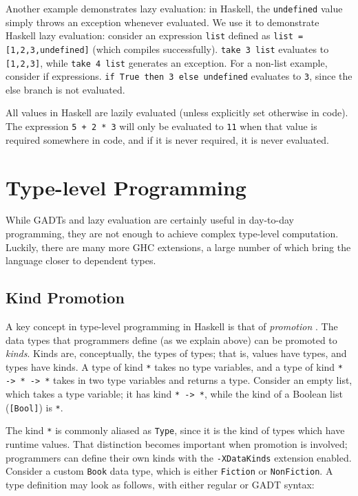 \documentclass[12pt, a4paper, bibliography=totocnumbered]{scrreprt}
\newcommand{\inline}[1]{\lstinline[basicstyle=\ttfamily\footnotesize]{#1}}
\begin{document}
Another example demonstrates lazy evaluation: in Haskell, the \inline{undefined} value simply throws an exception whenever evaluated. We use it to demonstrate Haskell lazy evaluation: consider an expression \inline{list} defined as \inline{list = [1,2,3,undefined]} (which compiles successfully). \inline{take 3 list} evaluates to \inline{[1,2,3]}, while \inline{take 4 list} generates an exception. For a non-list example, consider if expressions. \inline{if True then 3 else undefined} evaluates to \inline{3}, since the else branch is not evaluated.

All values in Haskell are lazily evaluated (unless explicitly set otherwise in code). The expression \inline{5 + 2 * 3} will only be evaluated to \inline{11} when that value is required somewhere in code, and if it is never required, it is never evaluated.

\section{Type-level Programming}

While GADTs and lazy evaluation are certainly useful in day-to-day programming, they are not enough to achieve complex type-level computation. Luckily, there are many more GHC extensions, a large number of which bring the language closer to dependent types.

\subsection{Kind Promotion}

A key concept in type-level programming in Haskell is that of \emph{promotion} \cite{givingpromotion}. The data types that programmers define (as we explain above) can be promoted to \emph{kinds}. Kinds are, conceptually, the types of types; that is, values have types, and types have kinds. A type of kind \inline{*} takes no type variables, and a type of kind \inline{* -> * -> *} takes in two type variables and returns a type. Consider an empty list, which takes a type variable; it has kind \inline{* -> *}, while the kind of a Boolean list (\inline{[Bool]}) is \inline{*}.

The kind \inline{*} is commonly aliased as \inline{Type}, since it is the kind of types which have runtime values. That distinction becomes important when promotion is involved; programmers can define their own kinds with the \inline{-XDataKinds} extension enabled. Consider a custom \inline{Book} data type, which is either \inline{Fiction} or \inline{NonFiction}. A type definition may look as follows, with either regular or GADT syntax:
\end{document}
